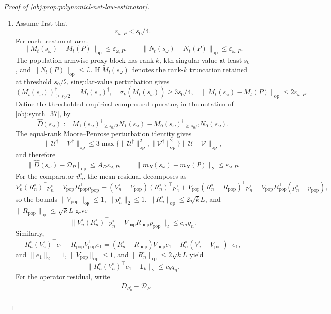 \begin{proof}[Proof of \cref{obj:prop:polynomial-net-law-estimator}]
\begin{enumerate}
\item Assume first that
\[
\varepsilon_{\omega,P}<s_0/4 .
\]
For each treatment arm,
\[
\|M_t(s_\omega)-M_t(P)\|_{\mathrm{op}}\le\varepsilon_{\omega,P},
\qquad
\|N_t(s_\omega)-N_t(P)\|_{\mathrm{op}}\le\varepsilon_{\omega,P}.
\]
The population armwise proxy block has rank \(k\), kth singular value at least \(s_0\), and \(\|N_t(P)\|_{\mathrm{op}}\le L\).  If \(\widetilde M_t(s_\omega)\) denotes the rank-\(k\) truncation retained at threshold \(s_0/2\), singular-value perturbation gives
\[
(M_t(s_\omega))^\dagger_{\ge s_0/2}=\widetilde M_t(s_\omega)^\dagger,
\quad
\sigma_k(\widetilde M_t(s_\omega))\ge3s_0/4,
\quad
\|\widetilde M_t(s_\omega)-M_t(P)\|_{\mathrm{op}}
\le2\varepsilon_{\omega,P}.
\]
Define the thresholded empirical compressed operator, in the notation of \cref{obj:synth_37}, by
\[
\widehat D(s_\omega):=
M_1(s_\omega)^\dagger{}_{\ge s_0/2}N_1(s_\omega)
-
M_0(s_\omega)^\dagger{}_{\ge s_0/2}N_0(s_\omega).
\]
The equal-rank Moore--Penrose perturbation identity gives
\[
\|\mathcal U^\dagger-\mathcal V^\dagger\|_{\mathrm{op}}
\le
3\max\{\|\mathcal U^\dagger\|_{\mathrm{op}}^2,\|\mathcal V^\dagger\|_{\mathrm{op}}^2\}
\|\mathcal U-\mathcal V\|_{\mathrm{op}},
\]
and therefore
\[
\|\widehat D(s_\omega)-\mathcal D_P\|_{\mathrm{op}}
\le A_D\varepsilon_{\omega,P},
\qquad
\|m_X(s_\omega)-m_X(P)\|_2\le\varepsilon_{\omega,P}.
\]
For the comparator \(\vartheta_n^\circ\), the mean residual decomposes as
\[
V_n^\circ(R_n^\circ)^\top p_n^\circ
-
V_{\mathrm{pop}}R_{\mathrm{pop}}^\top p_{\mathrm{pop}}
=
(V_n^\circ-V_{\mathrm{pop}})(R_n^\circ)^\top p_n^\circ
+
V_{\mathrm{pop}}(R_n^\circ-R_{\mathrm{pop}})^\top p_n^\circ
+
V_{\mathrm{pop}}R_{\mathrm{pop}}^\top(p_n^\circ-p_{\mathrm{pop}}),
\]
so the bounds \(\|V_{\mathrm{pop}}\|_{\mathrm{op}}\le1\), \(\|p_n^\circ\|_2\le1\),
\(\|R_n^\circ\|_{\mathrm{op}}\le2\sqrt{k}L\), and
\(\|R_{\mathrm{pop}}\|_{\mathrm{op}}\le\sqrt{k}L\) give
\[
\|V_n^\circ(R_n^\circ)^\top p_n^\circ
-
V_{\mathrm{pop}}R_{\mathrm{pop}}^\top p_{\mathrm{pop}}\|_2
\le c_mq_n .
\]
Similarly,
\[
R_n^\circ(V_n^\circ)^\top e_1
-
R_{\mathrm{pop}}V_{\mathrm{pop}}^\top e_1
=
(R_n^\circ-R_{\mathrm{pop}})V_{\mathrm{pop}}^\top e_1
+
R_n^\circ(V_n^\circ-V_{\mathrm{pop}})^\top e_1,
\]
and \(\|e_1\|_2=1\), \(\|V_{\mathrm{pop}}\|_{\mathrm{op}}\le1\), and
\(\|R_n^\circ\|_{\mathrm{op}}\le2\sqrt{k}L\) yield
\[
\|R_n^\circ(V_n^\circ)^\top e_1-\mathbf 1_k\|_2\le c_bq_n .
\]
For the operator residual, write
\[
\begin{aligned}
&D_{\vartheta_n^\circ}-\mathcal D_P \\

\end{aligned}\]
\end{enumerate}
\end{proof}
